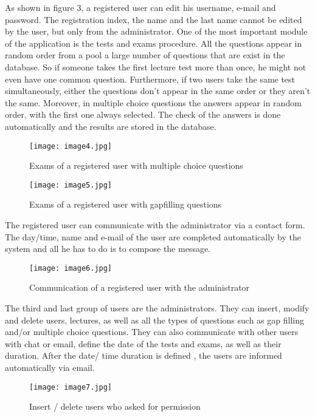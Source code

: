 \documentclass[10pt, conference, compsocconf]{IEEEtran}
\begin{document}
As shown in figure 3, a registered user can edit his username, e-mail and password. The registration index, the name and the last name  cannot be edited by the user, but only from the administrator. One of the most important module of the application is the tests and exams procedure. All the questions appear in random order from a pool a large number of questions that are exist in the database. So if someone takes the first lecture test more than once, he might not even have one common question. Furthermore, if two users take the same test  simultaneously, either the questions don’t appear in the same order or they aren’t the same. Moreover, in multiple choice questions the answers appear in random order, with the first one always selected. The check of the answers is done automatically and the results are stored in the database. 
 
\begin{figure}[!h]
	\centering
	\texttt{[image: image4.jpg]}
	\caption{Exams of a registered user with multiple choice questions}
\end{figure}


\begin{figure}[!h]
	\centering
	\texttt{[image: image5.jpg]}
	\caption{Exams of a registered user with gap\-filling questions}
\end{figure}


The registered user can communicate with the administrator via a contact form. The day/time, name and e-mail of the user  are completed automatically by the system and all he has to do is to  compose the message.

\begin{figure}[!h]
	\centering
	\texttt{[image: image6.jpg]}
	\caption{Communication of a registered user with the administrator}
\end{figure}

The third and last group of users are the administrators. They can insert, modify and delete users, lectures, as well as all the types of questions such as gap filling and/or multiple choice questions. They can also communicate with other users with chat or email, define the date of the tests and exams, as well as their duration. After the date/ time duration is defined , the users are informed automatically via email.

\begin{figure}[!h]
	\centering
	\texttt{[image: image7.jpg]}
	\caption{Insert / delete users who asked for permission}
\end{figure}
\end{document}
